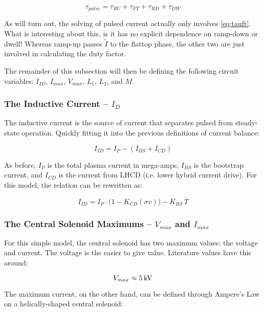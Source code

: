 \begin{equation}
	\tau_{pulse} = \tau_{RU} + \tau_{FT} + \tau_{RD} + \tau_{DW}
\end{equation}

As will turn out, the solving of pulsed current actually only involves \cref{eq:tauft}. What is interesting about this, is it has no explicit dependence on ramp-down or dwell! Whereas ramp-up passes $\tilde I$ to the flattop phase, the other two are just involved in calculating the duty factor.

The remainder of this subsection will then be defining the following circuit variables: $I_{ID}$, $I_{max}$, $V_{max}$, $L_1$, $L_2$, and $M$.

\subsubsection{The Inductive Current -- $I_D$}

The inductive current is the source of current that separates pulsed from steady-state operation. Quickly fitting it into the previous definitions of current balance:

\begin{equation}
	I_{ID} = I_P - ( I_{BS} + I_{CD} )
\end{equation}

As before, $I_P$ is the total plasma current in mega-amps, $I_{BS}$ is the bootstrap current, and $I_{CD}$ is the current from LHCD (i.e. lower hybrid current drive). For this model, the relation can be rewritten as:

\begin{equation}
	I_{ID} = I_P \cdot \Big( 1 - K_{CD} ( \sigma v ) \Big) - K_{BS} \, \overline T
\end{equation}

\subsubsection{The Central Solenoid Maximums -- $V_{max}$ and $I_{max}$}

For this simple model, the central solenoid has two maximum values: the voltage and current. The voltage is the easier to give value. Literature values have this around:

\begin{equation}
	V_{max} \approx 5 \, \textnormal{kV}
\end{equation}

The maximum current, on the other hand, can be defined through Ampere's Law on a helically-shaped central solenoid:

